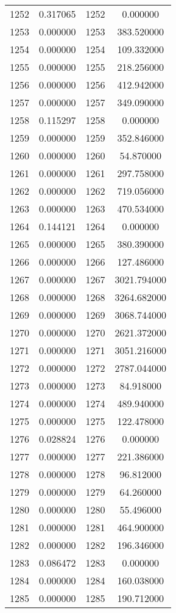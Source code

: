\documentclass[12pt]{article}
\begin{document}
\begin{longtable}{@{}cccc@{}}
1252 & 0.317065 & 1252 & 0.000000 \\
1253 & 0.000000 & 1253 & 383.520000 \\
1254 & 0.000000 & 1254 & 109.332000 \\
1255 & 0.000000 & 1255 & 218.256000 \\
1256 & 0.000000 & 1256 & 412.942000 \\
1257 & 0.000000 & 1257 & 349.090000 \\
1258 & 0.115297 & 1258 & 0.000000 \\
1259 & 0.000000 & 1259 & 352.846000 \\
1260 & 0.000000 & 1260 & 54.870000 \\
1261 & 0.000000 & 1261 & 297.758000 \\
1262 & 0.000000 & 1262 & 719.056000 \\
1263 & 0.000000 & 1263 & 470.534000 \\
1264 & 0.144121 & 1264 & 0.000000 \\
1265 & 0.000000 & 1265 & 380.390000 \\
1266 & 0.000000 & 1266 & 127.486000 \\
1267 & 0.000000 & 1267 & 3021.794000 \\
1268 & 0.000000 & 1268 & 3264.682000 \\
1269 & 0.000000 & 1269 & 3068.744000 \\
1270 & 0.000000 & 1270 & 2621.372000 \\
1271 & 0.000000 & 1271 & 3051.216000 \\
1272 & 0.000000 & 1272 & 2787.044000 \\
1273 & 0.000000 & 1273 & 84.918000 \\
1274 & 0.000000 & 1274 & 489.940000 \\
1275 & 0.000000 & 1275 & 122.478000 \\
1276 & 0.028824 & 1276 & 0.000000 \\
1277 & 0.000000 & 1277 & 221.386000 \\
1278 & 0.000000 & 1278 & 96.812000 \\
1279 & 0.000000 & 1279 & 64.260000 \\
1280 & 0.000000 & 1280 & 55.496000 \\
1281 & 0.000000 & 1281 & 464.900000 \\
1282 & 0.000000 & 1282 & 196.346000 \\
1283 & 0.086472 & 1283 & 0.000000 \\
1284 & 0.000000 & 1284 & 160.038000 \\
1285 & 0.000000 & 1285 & 190.712000 \\

\end{longtable}
\end{document}
